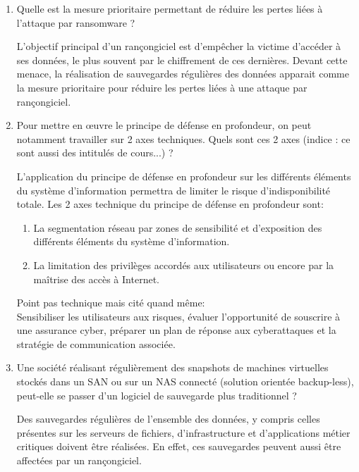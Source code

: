 \documentclass[a4paper]{article}
\begin{document}
\begin{enumerate}
\item Quelle est la mesure prioritaire permettant de réduire les pertes liées à l'attaque par ransomware ?
\begin{example}
    L'objectif principal d’un rançongiciel est d’empêcher la victime d’accéder à ses données, le plus souvent par le chiffrement de ces dernières. Devant cette menace, la réalisation de sauvegardes régulières des données apparait comme la mesure prioritaire pour réduire les pertes liées à une attaque par rançongiciel.
\end{example}



\item Pour mettre en œuvre le principe de défense en profondeur, on peut notamment travailler sur 2 axes techniques. Quels sont ces 2 axes (indice : ce sont aussi des intitulés de cours...) ?
\begin{example}
    L’application du principe de défense en profondeur sur les différents éléments du système d’information permettra de limiter le risque d’indisponibilité totale. Les 2 axes technique du principe de défense en profondeur sont:
    \begin{enumerate}
        \item La segmentation réseau par zones de sensibilité et d’exposition des différents éléments du système d’information.
        \item La limitation des privilèges accordés aux utilisateurs ou encore par la maîtrise des accès à Internet.
    \end{enumerate}
    Point pas technique mais cité quand même: \\
    Sensibiliser les utilisateurs aux risques, évaluer l’opportunité de souscrire à une assurance cyber, préparer un plan de réponse aux cyberattaques et la stratégie de communication associée.
\end{example}



\item Une société réalisant régulièrement des snapshots de machines virtuelles stockés dans un SAN ou sur un NAS connecté (solution orientée backup-less), peut-elle se passer d'un logiciel de sauvegarde plus traditionnel ?
\begin{example}
    Des sauvegardes régulières de l’ensemble des données, y compris celles présentes sur les serveurs de fichiers, d’infrastructure et d’applications métier critiques doivent être réalisées. En effet, ces sauvegardes peuvent aussi être affectées par un rançongiciel.


\end{example}
\end{enumerate}
\end{document}
